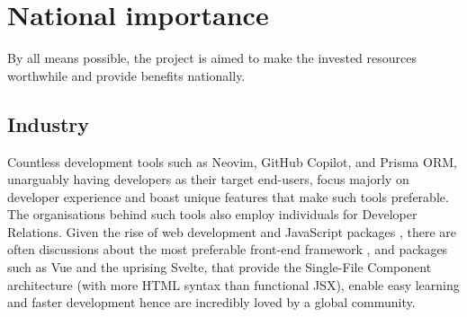 \documentclass{prrcs}
\newcommand{\cmmnt}[1]{}
\begin{document}
\section*{National importance}




By all means possible, the project is aimed to make the invested resources worthwhile and provide benefits nationally.

\subsection*{Industry}

Countless development tools such as Neovim, GitHub Copilot, and Prisma ORM, unarguably having developers as their target end-users, focus majorly on developer experience and boast unique features that make such tools preferable. The organisations behind such tools also employ individuals for Developer Relations. Given the rise of web development and JavaScript packages \cite{StackOverflowDeveloper,StateJS2021}, there are often discussions about the most preferable front-end framework \cite{UnderstandingClientsideJavaScript2023}, and packages such as Vue\cmmnt{\cite{VueJsProgressive}} and the uprising Svelte\cmmnt{\cite{SvelteCyberneticallyEnhanced}}, that provide the Single-File Component architecture (with more HTML syntax than functional JSX), enable easy learning and faster development hence are incredibly loved by a global community.
\end{document}
